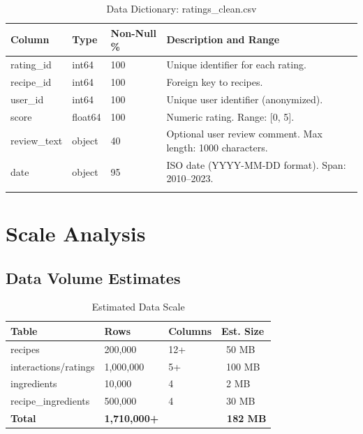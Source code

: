 \documentclass[11pt,a4paper]{article}
\begin{document}
\begin{longtable}{|p{2.5cm}|p{1.5cm}|p{2.5cm}|p{6.5cm}|}
    \hline
    \textbf{Column} & \textbf{Type} & \textbf{Non-Null \%} & \textbf{Description and Range} \\
    \hline
    \endhead
    
    rating\_id & int64 & 100 & Unique identifier for each rating. \\
    \hline
    recipe\_id & int64 & 100 & Foreign key to recipes. \\
    \hline
    user\_id & int64 & 100 & Unique user identifier (anonymized). \\
    \hline
    score & float64 & 100 & Numeric rating. Range: [0, 5]. \\
    \hline
    review\_text & object & 40 & Optional user review comment. Max length: 1000 characters. \\
    \hline
    date & object & 95 & ISO date (YYYY-MM-DD format). Span: 2010--2023. \\
    \hline
    
    \caption{Data Dictionary: ratings\_clean.csv}
    \label{tab:dd_ratings}
\end{longtable}

\newpage

\section{Scale Analysis}

\subsection{Data Volume Estimates}

\begin{table}[H]
    \centering
    \begin{tabular}{|p{3.5cm}|p{2.5cm}|p{2.5cm}|p{3cm}|}
        \hline
        \textbf{Table} & \textbf{Rows} & \textbf{Columns} & \textbf{Est. Size} \\
        \hline
        recipes & 200,000 & 12+ & ~50 MB \\
        \hline
        interactions/ratings & 1,000,000 & 5+ & ~100 MB \\
        \hline
        ingredients & 10,000 & 4 & ~2 MB \\
        \hline
        recipe\_ingredients & 500,000 & 4 & ~30 MB \\
        \hline
        \textbf{Total} & \textbf{1,710,000+} & & \textbf{~182 MB} \\
        \hline
    \end{tabular}
    \caption{Estimated Data Scale}
    \label{tab:scale}
\end{table}
\end{document}
